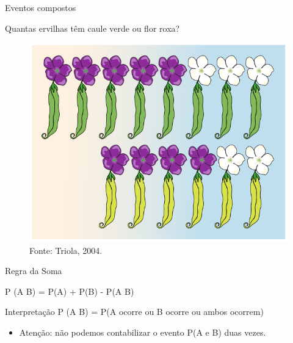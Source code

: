 \documentclass{beamer}
\begin{document}
\begin{frame}{Eventos compostos}
  \begin{example}
    Quantas ervilhas têm caule verde \alert{ou} flor roxa?
  \end{example}
  \begin{figure}
    \centering
    \includegraphics[height=0.6\textheight]{Prob_I/ervilhas-genetica}
    \caption{Fonte: Triola, 2004.}
  \end{figure}
\end{frame}


\begin{frame}{Regra da Soma}
  \begin{definition}
    P (A  B) = P(A) + P(B) - P(A  B)
  \end{definition}
  \begin{block}{Interpretação}
    P (A  B) = P(A ocorre ou B ocorre ou ambos ocorrem)
  \end{block}
  \begin{itemize}
  \item Atenção: não podemos contabilizar o evento P(A e B) duas
    vezes.
  \end{itemize}
\end{frame}
\end{document}
